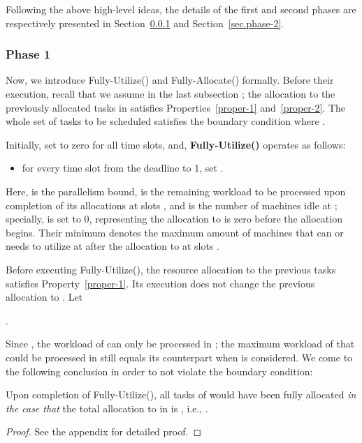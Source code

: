 \documentclass[10pt,journal,compsoc]{IEEEtran}
\begin{document}
Following the above high-level ideas, the details of the first and second phases are respectively presented in Section~\ref{sec.phase-1} and Section~\ref{sec.phase-2}.





\subsubsection{Phase 1}
\label{sec.phase-1}










Now, we introduce Fully-Utilize() and Fully-Allocate() formally. Before their execution, recall that we assume in the last subsection ; the allocation to the previously allocated tasks in  satisfies Properties~\ref{proper-1} and~\ref{proper-2}. The whole set of tasks  to be scheduled satisfies the boundary condition where .


Initially, set  to zero for all time slots, and, \textbf{Fully-Utilize()} operates as follows:\begin{itemize}
\item for every time slot  from the deadline  to 1, set .
\end{itemize}
Here,  is the parallelism bound,  is the remaining workload to be processed upon completion of its allocations at slots , and  is the number of machines idle at ; specially,  is set to 0, representing the allocation to  is zero before the allocation begins. Their minimum denotes the maximum amount of machines that  can or needs to utilize at  after the allocation to  at slots .


Before executing Fully-Utilize(), the resource allocation to the previous tasks  satisfies Property~\ref{proper-1}. Its execution does not change the previous allocation to . Let
\begin{center}
.
\end{center}
Since , the workload of  can only be processed in ; the maximum workload of  that could be processed in  still equals its counterpart when  is considered. We come to the following conclusion in order to not violate the boundary condition:






\begin{lemma}\label{exit-condition-1}
Upon completion of Fully-Utilize(), all tasks of  would have been fully allocated {\em in the case that} the total allocation to  in  is , i.e., .
\end{lemma}
\begin{proof}
See the appendix for detailed proof.
\end{proof}
\end{document}
